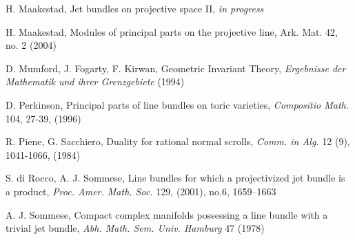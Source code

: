 \documentclass{amsart}
\theoremstyle{plain}
\theoremstyle{definition}
\theoremstyle{remark}
\numberwithin{equation}{theorem}
\begin{document}
\begin{thebibliography}{4}
 H. Maakestad, Jet bundles on projective space II,
  \emph{in progress}

 H. Maakestad, Modules of principal parts on the
  projective line, Ark. Mat. 42, no. 2 (2004)

 D. Mumford, J. Fogarty, F. Kirwan, Geometric
  Invariant Theory, \emph{Ergebnisse der Mathematik und ihrer
    Grenzgebiete} (1994)

 D. Perkinson, Principal parts of line bundles on
    toric varieties, \emph{Compositio Math.} 104, 27-39, (1996)

 R. Piene, G. Sacchiero, Duality for rational
    normal scrolls, \emph{Comm. in Alg.} 12 (9), 1041-1066, (1984) 

 S. di Rocco, A. J. Sommese, Line bundles for
which a projectivized jet bundle is a product,
\emph{Proc. Amer. Math. Soc.} 129, (2001), no.6, 1659--1663 

 A. J. Sommese, Compact complex manifolds possessing a line bundle
with a trivial jet bundle, \emph{Abh. Math. Sem. Univ. Hamburg} 47 (1978)

\end{thebibliography}
\end{document}
